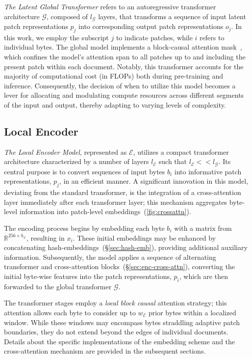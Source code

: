 \textit{The Latent Global Transformer} refers to an autoregressive transformer architecture $\mathcal{G}$, composed of $l_{\mathcal{G}}$ layers, that transforms a sequence of input latent patch representations $p_j$ into corresponding output patch representations $o_j$. In this work, we employ the subscript $j$ to indicate patches, while $i$ refers to individual bytes. The global model implements a block-causal attention mask~\citep{dubey2024llama}, which confines the model’s attention span to all patches up to and including the present patch within each document. Notably, this transformer accounts for the majority of computational cost (in FLOPs) both during pre-training and inference. Consequently, the decision of when to utilize this model becomes a lever for allocating and modulating compute resources across different segments of the input and output, thereby adapting to varying levels of complexity.

\subsection{Local Encoder}
\label{section:local}

\textit{The Local Encoder Model}, represented as $\mathcal{E}$, utilizes a compact transformer architecture characterized by a number of layers $l_{\mathcal{E}}$ such that $l_{\mathcal{E}} << l_{\mathcal{G}}$. Its central purpose is to convert sequences of input bytes $b_i$ into informative patch representations, $p_j$, in an efficient manner. A significant innovation in this model, deviating from the standard transformer, is the integration of a cross-attention layer immediately after each transformer layer; this mechanism aggregates byte-level information into patch-level embeddings~(\autoref{fig:crossattn}).

The encoding process begins by embedding each byte $b_i$ with a matrix from $\mathbb{R}^{256 \times h_{\mathcal{E}}}$, resulting in $x_i$. These initial embeddings may be enhanced by concatenating hash-embeddings~(\S\ref{sec:hash-emb}), providing additional auxiliary information. Subsequently, the model applies a sequence of alternating transformer and cross-attention blocks~(\S\ref{sec:enc-cross-attn}), converting the initial byte-wise features into the patch representations, $p_i$, which are then forwarded to the global transformer $\mathcal{G}$.

The transformer stages employ a \textit{local block causal} attention strategy; this attention allows each byte to consider up to $w_{\mathcal{E}}$ prior bytes within a localized window. While these windows may encompass bytes straddling adaptive patch boundaries, they do not extend beyond the edges of individual documents. Details about the specific implementations of the embedding scheme and the cross-attention mechanism are provided in the subsequent sections.

